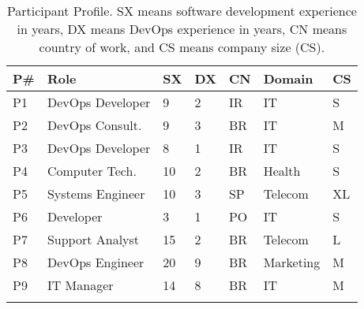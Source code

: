 \begin{table}[t]
\centering
\caption{Participant Profile. SX means software development experience in years, DX means DevOps experience in years, CN means country of work, and CS means company size (CS).}
\label{participant_table}
\begin{tabular}{|p{0.4cm}|p{2.6cm}|p{0.4cm}|p{0.45cm}|p{0.5cm}|p{1.3cm}|p{0.3cm}|} \toprule \centering
\textbf{P\#}          & \textbf{Role}
       & \textbf{SX} & \textbf{DX} & \textbf{CN}   & \textbf{Domain}    & \multicolumn{1}{l}{\textbf{CS}} \\ \midrule \centering
P1                   & DevOps Developer      & 9            & 2           & IR            & IT                 & S                               \\ \centering

P2                   & DevOps Consult.       & 9            & 3           & BR            & IT                 & M                               \\ \centering

P3                   & DevOps Developer      & 8            & 1           & IR            & IT                 & S                               \\ \centering

P4                   & Computer Tech.        & 10           & 2           & BR            & Health             & S                               \\ \centering

P5                   & Systems Engineer      & 10           & 3           & SP            & Telecom            & XL                              \\ \centering

P6                   & Developer             & 3            & 1           & PO            & IT                 & S                               \\ \centering

P7                   & Support Analyst       & 15           & 2           & BR            & Telecom            & L                               \\ \centering

P8                   & DevOps Engineer       & 20           & 9           & BR            & Marketing              & M                               \\ \centering

P9                   & IT Manager            & 14           & 8           & BR            & IT                 & M                               \\ \centering


\end{tabular}
\end{table}
